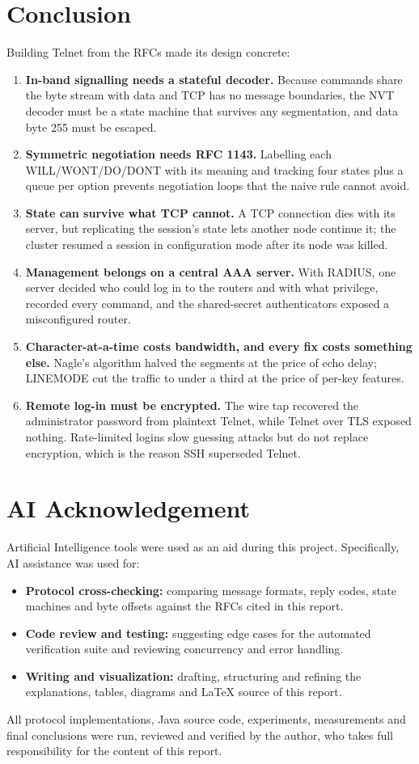 \documentclass[11pt,a4paper]{article}
\begin{document}
\section{Conclusion}
Building Telnet from the RFCs made its design concrete:
\begin{enumerate}[leftmargin=2em]
    \item \textbf{In-band signalling needs a stateful decoder.} Because commands share the byte stream with data and TCP has no message boundaries, the NVT decoder must be a state machine that survives any segmentation, and data byte 255 must be escaped.
    \item \textbf{Symmetric negotiation needs RFC 1143.} Labelling each WILL/WONT/DO/DONT with its meaning and tracking four states plus a queue per option prevents negotiation loops that the naive rule cannot avoid.
    \item \textbf{State can survive what TCP cannot.} A TCP connection dies with its server, but replicating the session's state lets another node continue it; the cluster resumed a session in configuration mode after its node was killed.
    \item \textbf{Management belongs on a central AAA server.} With RADIUS, one server decided who could log in to the routers and with what privilege, recorded every command, and the shared-secret authenticators exposed a misconfigured router.
    \item \textbf{Character-at-a-time costs bandwidth, and every fix costs something else.} Nagle's algorithm halved the segments at the price of echo delay; LINEMODE cut the traffic to under a third at the price of per-key features.
    \item \textbf{Remote log-in must be encrypted.} The wire tap recovered the administrator password from plaintext Telnet, while Telnet over TLS exposed nothing. Rate-limited logins slow guessing attacks but do not replace encryption, which is the reason SSH superseded Telnet.
\end{enumerate}

\section*{AI Acknowledgement}
Artificial Intelligence tools were used as an aid during this project. Specifically, AI assistance was used for:
\begin{itemize}[leftmargin=2em]
    \item \textbf{Protocol cross-checking:} comparing message formats, reply codes, state machines and byte offsets against the RFCs cited in this report.
    \item \textbf{Code review and testing:} suggesting edge cases for the automated verification suite and reviewing concurrency and error handling.
    \item \textbf{Writing and visualization:} drafting, structuring and refining the explanations, tables, diagrams and \LaTeX{} source of this report.
\end{itemize}
All protocol implementations, Java source code, experiments, measurements and final conclusions were run, reviewed and verified by the author, who takes full responsibility for the content of this report.
\end{document}
